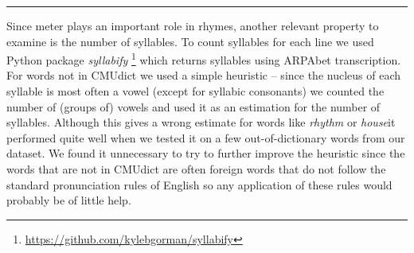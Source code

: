 	
\noindent\rule{14cm}{0.4pt}

Since meter plays an important role in rhymes, another relevant property to examine is the number of syllables. To count syllables for each line we used Python package \textit{syllabify} \footnote{\url{https://github.com/kylebgorman/syllabify}} which returns syllables using ARPAbet transcription. For words not in CMUdict we used a simple heuristic -- since the nucleus of each syllable is most often a vowel (except for syllabic consonants) we counted the number of (groups of) vowels and used it as an estimation for the number of syllables. Although this gives a wrong estimate for words like \textit{rhythm} or \textit{house}it performed quite well when we tested it on a few out-of-dictionary words from our dataset. We found it unnecessary to try to further improve the heuristic since the words that are not in CMUdict are often foreign words that do not follow the standard pronunciation rules of English so any application of these rules would probably be of little help.


